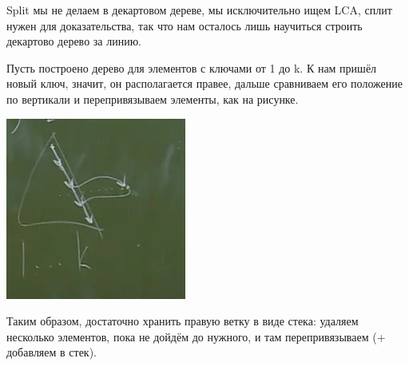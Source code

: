 Split мы не делаем в декартовом дереве, мы исключительно ищем LCA, сплит нужен для доказательства, так что нам осталось лишь научиться строить декартово дерево за линию.

Пусть построено дерево для элементов с ключами от 1 до k. К нам пришёл новый ключ, значит, он располагается правее, дальше сравниваем его положение по вертикали и перепривязываем элементы, как на рисунке.

\includegraphics[height = 4 cm]{images/96-99_decart}

Таким образом, достаточно хранить правую ветку в виде стека: удаляем несколько элементов, пока не дойдём до нужного, и там перепривязываем (+ добавляем в стек).